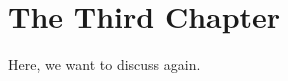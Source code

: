 \chapter{The Third Chapter}\label{chapter:chapter}

Here, we want to discuss \cite{dieck2008algebraic} again.
